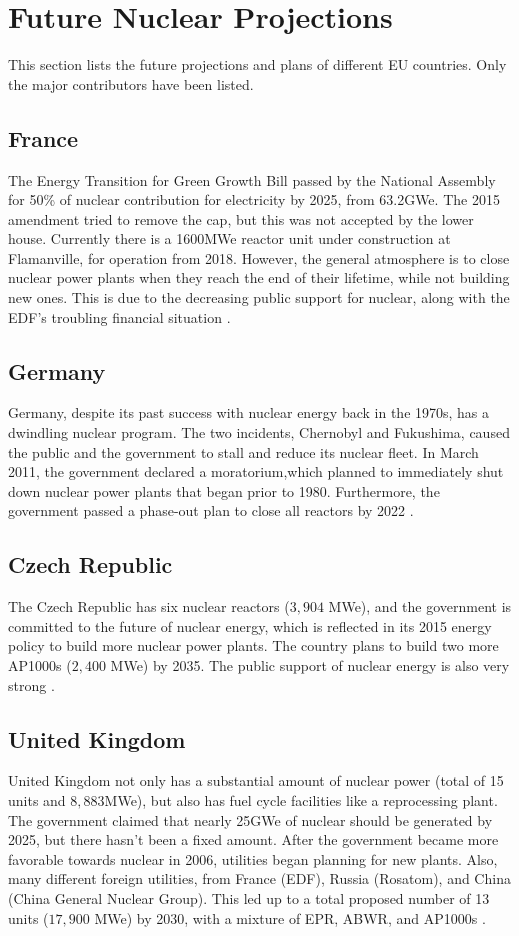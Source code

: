 \section{Future Nuclear Projections}
This section lists the future projections and plans of
different EU countries. Only the major contributors have been listed.

\subsection{France}
The Energy Transition for Green Growth Bill passed by the National Assembly for 50\% of
nuclear contribution for electricity by 2025, from 63.2GWe. The 2015 amendment tried to remove
the cap, but this was not accepted by the lower house. Currently there is a
1600MWe reactor unit under construction at Flamanville, for operation from 2018.
However, the general atmosphere is to close nuclear power plants when they reach the end
of their lifetime, while not building new ones. This is due to the decreasing
public support for nuclear, along with the \gls{EDF}'s troubling financial situation \cite{noauthor_nuclear_2017}.

\subsection{Germany}
Germany, despite its past success with nuclear energy back in the 1970s,
has a dwindling nuclear program. The two incidents, Chernobyl and Fukushima,
caused the public and the government to stall and reduce its nuclear fleet.
In March 2011, the government declared a moratorium,which planned to immediately
shut down nuclear power plants that began prior to 1980. Furthermore, the government
passed a phase-out plan to close all reactors by 2022 \cite{noauthor_nuclear_2017-1}.

\subsection{Czech Republic}
The Czech Republic has six nuclear reactors ($3,904$ MWe), and the government is committed to the
future of nuclear energy, which is reflected in its 2015 energy policy to build 
more nuclear power plants. The country plans to build two more AP1000s ($2,400$ MWe) by 2035.
The public support of nuclear energy is also very strong \cite{noauthor_nuclear_2017-2}.

\subsection{United Kingdom}
United Kingdom not only has a substantial amount of nuclear power (total of 15 units
and $8,883$MWe), but also has fuel cycle facilities like a reprocessing plant. The government
claimed that nearly 25GWe of nuclear should be generated by 2025, but there hasn't been
a fixed amount. After the government became more favorable towards nuclear in 2006, utilities
began planning for new plants. Also, many different foreign utilities, from France (EDF),
Russia (Rosatom), and China (China General Nuclear Group). This led up to a total proposed
number of 13 units ($17,900$ MWe) by 2030, with a mixture of EPR, ABWR, and AP1000s \cite{noauthor_nuclear_2017-3}.

